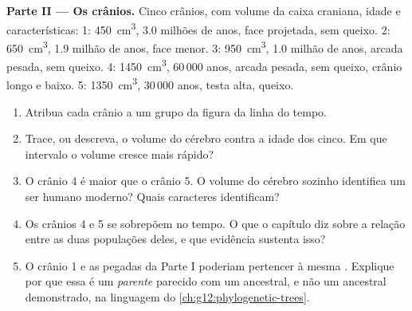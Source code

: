 \begin{problem}
\medskip
\noindent\textbf{Parte II --- Os crânios.}
Cinco crânios, com volume da caixa craniana, idade e características:
1: \qty{450}{cm^3}, 3.0 milhões de anos, face projetada, sem queixo.
2: \qty{650}{cm^3}, 1.9 milhão de anos, face menor.
3: \qty{950}{cm^3}, 1.0 milhão de anos, arcada pesada, sem queixo.
4: \qty{1450}{cm^3}, 60\,000 anos, arcada pesada, sem queixo, crânio
longo e baixo.
5: \qty{1350}{cm^3}, 30\,000 anos, testa alta, queixo.
\begin{enumerate}[resume]
  \item Atribua cada crânio a um grupo da figura da linha do tempo.
  \item Trace, ou descreva, o volume do cérebro contra a idade dos
        cinco. Em que intervalo o volume cresce mais rápido?
  \item O crânio 4 é maior que o crânio 5. O volume do cérebro sozinho
        identifica um ser humano moderno? Quais caracteres identificam?
  \item Os crânios 4 e 5 se sobrepõem no tempo. O que o capítulo diz
        sobre a relação entre as duas populações deles, e que evidência
        sustenta isso?
  \item O crânio 1 e as pegadas da Parte I poderiam pertencer à mesma
        . Explique por que essa  é um \emph{parente}
        parecido com um ancestral, e não um ancestral demonstrado, na
        linguagem do \cref{ch:g12:phylogenetic-trees}.
\end{enumerate}


\end{problem}
